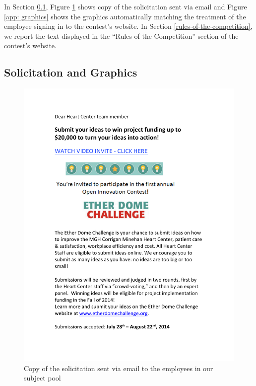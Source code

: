 \documentclass[11pt, titlepage]{article}
\begin{document}
In Section \ref{solicitation-and-graphics}, Figure
\ref{app: solicitation} shows copy of the solicitation sent via email
and Figure \ref{app: graphics} shows the graphics automatically matching
the treatment of the employee signing in to the contest's website. In
Section \ref{rules-of-the-competition}, we report the text displayed in
the ``Rules of the Competition'' section of the contest's website.

\subsection{Solicitation and Graphics}\label{solicitation-and-graphics}

\begin{figure}
\centering
\caption{Copy of the solicitation sent via email to the employees in our subject pool}
\label{app: solicitation}
\includegraphics[width=\textwidth]{Images/solicitationEmail.pdf}
\end{figure}
\end{document}
